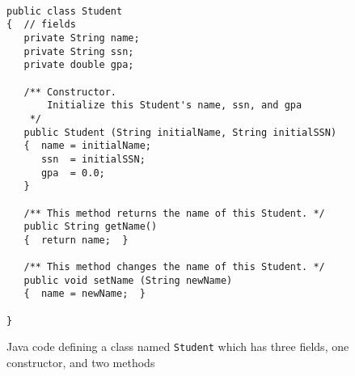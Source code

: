 





\begin {figure}


\begin{verbatim}

public class Student
{  // fields
   private String name;
   private String ssn;
   private double gpa;

   /** Constructor.
       Initialize this Student's name, ssn, and gpa
    */
   public Student (String initialName, String initialSSN)
   {  name = initialName;
      ssn  = initialSSN;
      gpa  = 0.0;
   }

   /** This method returns the name of this Student. */
   public String getName()
   {  return name;  }

   /** This method changes the name of this Student. */
   public void setName (String newName)
   {  name = newName;  }

}
\end{verbatim}

\caption {Java code defining a class named
\texttt {Student} which has three fields,
one constructor, and two methods }
\label {fig:classWithConstr}

\end {figure}


